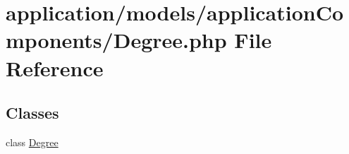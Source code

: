 \hypertarget{_degree_8php}{\section{application/models/application\-Components/\-Degree.php File Reference}
\label{_degree_8php}
}
\subsection*{Classes}
\begin{DoxyCompactItemize}
\item 
class \hyperlink{class_degree}{Degree}
\end{DoxyCompactItemize}
